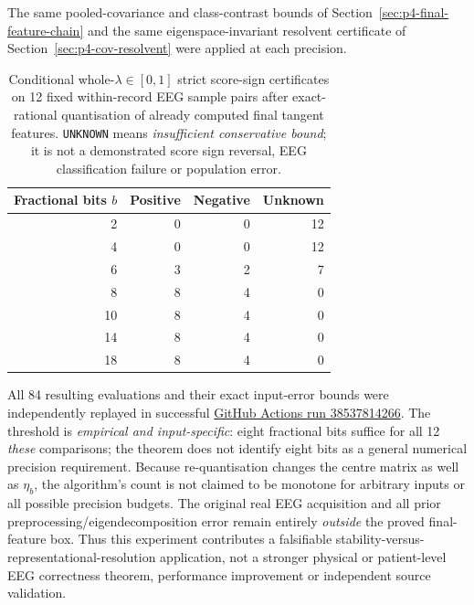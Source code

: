 The same pooled-covariance and class-contrast
bounds of Section~\ref{sec:p4-final-feature-chain}
and the same eigenspace-invariant
resolvent certificate of
Section~\ref{sec:p4-cov-resolvent}
were applied at each precision.
\begin{table}[ht]\centering\small
\caption{Conditional whole-$\lambda\in[0,1]$
strict score-sign certificates on 12 fixed
within-record EEG sample pairs after exact-rational
quantisation of already computed final tangent features.
\texttt{UNKNOWN} means \emph{insufficient conservative
bound}; it is not a demonstrated score sign reversal,
EEG classification failure or population error.}
\label{tab:p4-feature-bits}
\begin{tabular}{rrrr}
\toprule
Fractional bits $b$ & Positive & Negative & Unknown\\
\midrule
2 & 0 & 0 & 12\\
4 & 0 & 0 & 12\\
6 & 3 & 2 & 7\\
8 & 8 & 4 & 0\\
10 & 8 & 4 & 0\\
14 & 8 & 4 & 0\\
18 & 8 & 4 & 0\\
\bottomrule
\end{tabular}
\end{table}
All 84 resulting evaluations and their exact
input-error bounds were independently replayed
in successful
\href{https://github.com/lindicaphxag-tech/kaggle/actions/runs/38537814266}
{GitHub Actions run 38537814266}.
The threshold is \emph{empirical and input-specific}:
eight fractional bits suffice for all 12
\emph{these} comparisons; the theorem does not
identify eight bits as a general numerical
precision requirement. Because re-quantisation
changes the centre matrix as well as $\eta_b$,
the algorithm's count is not claimed to
be monotone for arbitrary inputs or
all possible precision budgets.
The original real EEG acquisition and all
prior preprocessing/eigendecomposition error
remain entirely \emph{outside} the proved
final-feature box. Thus this experiment
contributes a falsifiable stability-versus-
representational-resolution application,
not a stronger physical or patient-level
EEG correctness theorem, performance
improvement or independent source validation.
